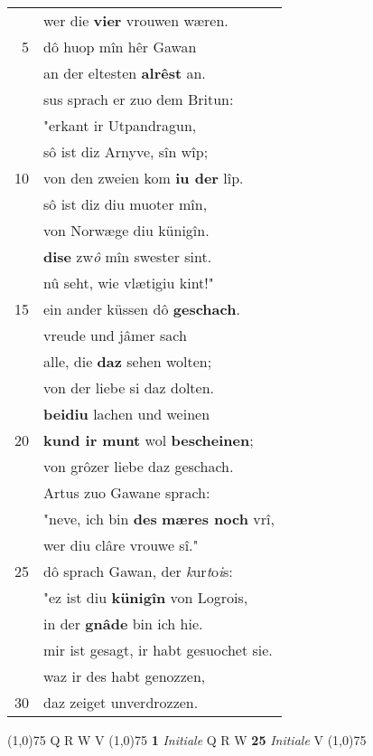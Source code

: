 \documentclass[8pt,a4paper,notitlepage]{article}
\begin{document}
\begin{table}[ht]
\begin{minipage}[t]{0.5\linewidth}
\begin{tabular}{rl}
 & wer die \textbf{vier} vrouwen wæren.\\ 
5 & dô huop mîn hêr Gawan\\ 
 & an der eltesten \textbf{alrêst} an.\\ 
 & sus sprach er zuo dem Britun:\\ 
 & "erkant ir Utpandragun,\\ 
 & sô ist diz Arnyve, sîn wîp;\\ 
10 & von den zweien kom \textbf{iu der} lîp.\\ 
 & sô ist diz diu muoter mîn,\\ 
 & von Norwæge diu künigîn.\\ 
 & \textbf{dise} zw\textit{ô} mîn swester sint.\\ 
 & nû seht, wie vlætigiu kint!"\\ 
15 & ein ander küssen dô \textbf{geschach}.\\ 
 & vreude und jâmer sach\\ 
 & alle, die \textbf{daz} sehen wolten;\\ 
 & von der liebe si daz dolten.\\ 
 & \textbf{beidiu} lachen und weinen\\ 
20 & \textbf{kund ir munt} wol \textbf{bescheinen};\\ 
 & von grôzer liebe daz geschach.\\ 
 & Artus zuo Gawane sprach:\\ 
 & "neve, ich bin \textbf{des} \textbf{mæres noch} vrî,\\ 
 & wer diu clâre vrouwe sî."\\ 
25 & dô sprach Gawan, der \textit{k}ur\textit{t}o\textit{i}s:\\ 
 & "ez ist diu \textbf{künigîn} von Logrois,\\ 
 & in der \textbf{gnâde} bin ich hie.\\ 
 & mir ist gesagt, ir habt gesuochet sie.\\ 
 & waz ir des habt genozzen,\\ 
30 & daz zeiget unverdrozzen.\\ 
\end{tabular}
\scriptsize
\line(1,0){75} \newline
Q R W V \newline
\line(1,0){75} \newline
\textbf{1} \textit{Initiale} Q R W  \textbf{25} \textit{Initiale} V  \newline
\line(1,0){75} \newline

\end{minipage}
\end{table}
\end{document}
